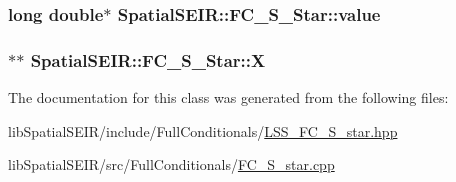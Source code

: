 \hypertarget{classSpatialSEIR_1_1FC__S__Star_a92c36f1dc6a099c072ffe591c3ceac2c}{
\subsubsection[{value}]{\setlength{\rightskip}{0pt plus 5cm}long double$\ast$ Spatial\-S\-E\-I\-R\-::\-F\-C\-\_\-\-S\-\_\-\-Star\-::value}}\label{classSpatialSEIR_1_1FC__S__Star_a92c36f1dc6a099c072ffe591c3ceac2c}
\hypertarget{classSpatialSEIR_1_1FC__S__Star_a46f078abec44ca9708b65a8ab402ddb7}{
\subsubsection[{X}]{$\ast$$\ast$ Spatial\-S\-E\-I\-R\-::\-F\-C\-\_\-\-S\-\_\-\-Star\-::\-X}}\label{classSpatialSEIR_1_1FC__S__Star_a46f078abec44ca9708b65a8ab402ddb7}


The documentation for this class was generated from the following files\-:\begin{DoxyCompactItemize}
\item 
lib\-Spatial\-S\-E\-I\-R/include/\-Full\-Conditionals/\hyperlink{LSS__FC__S__star_8hpp}{L\-S\-S\-\_\-\-F\-C\-\_\-\-S\-\_\-star.\-hpp}\item 
lib\-Spatial\-S\-E\-I\-R/src/\-Full\-Conditionals/\hyperlink{FC__S__star_8cpp}{F\-C\-\_\-\-S\-\_\-star.\-cpp}\end{DoxyCompactItemize}
